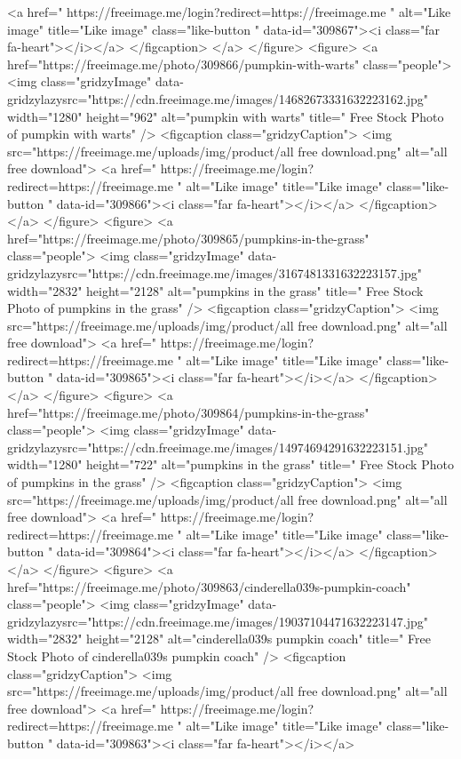 <a href=" https://freeimage.me/login?redirect=https://freeimage.me " alt="Like image" title="Like image" class="like-button  " data-id="309867"><i class="far fa-heart"></i></a>
</figcaption>
</a>
</figure>
<figure>
<a href="https://freeimage.me/photo/309866/pumpkin-with-warts" class="people">
<img class="gridzyImage" data-gridzylazysrc="https://cdn.freeimage.me/images/14682673331632223162.jpg" width="1280" height="962" alt="pumpkin with warts" title=" Free Stock Photo of pumpkin with warts" />
<figcaption class="gridzyCaption">
<img src="https://freeimage.me/uploads/img/product/all free download.png" alt="all free download">
<a href=" https://freeimage.me/login?redirect=https://freeimage.me " alt="Like image" title="Like image" class="like-button  " data-id="309866"><i class="far fa-heart"></i></a>
</figcaption>
 </a>
</figure>
<figure>
<a href="https://freeimage.me/photo/309865/pumpkins-in-the-grass" class="people">
<img class="gridzyImage" data-gridzylazysrc="https://cdn.freeimage.me/images/3167481331632223157.jpg" width="2832" height="2128" alt="pumpkins in the grass" title=" Free Stock Photo of pumpkins in the grass" />
<figcaption class="gridzyCaption">
<img src="https://freeimage.me/uploads/img/product/all free download.png" alt="all free download">
<a href=" https://freeimage.me/login?redirect=https://freeimage.me " alt="Like image" title="Like image" class="like-button  " data-id="309865"><i class="far fa-heart"></i></a>
</figcaption>
</a>
</figure>
<figure>
<a href="https://freeimage.me/photo/309864/pumpkins-in-the-grass" class="people">
<img class="gridzyImage" data-gridzylazysrc="https://cdn.freeimage.me/images/14974694291632223151.jpg" width="1280" height="722" alt="pumpkins in the grass" title=" Free Stock Photo of pumpkins in the grass" />
<figcaption class="gridzyCaption">
<img src="https://freeimage.me/uploads/img/product/all free download.png" alt="all free download">
<a href=" https://freeimage.me/login?redirect=https://freeimage.me " alt="Like image" title="Like image" class="like-button  " data-id="309864"><i class="far fa-heart"></i></a>
</figcaption>
</a>
</figure>
<figure>
<a href="https://freeimage.me/photo/309863/cinderella039s-pumpkin-coach" class="people">
<img class="gridzyImage" data-gridzylazysrc="https://cdn.freeimage.me/images/19037104471632223147.jpg" width="2832" height="2128" alt="cinderella039s pumpkin coach" title=" Free Stock Photo of cinderella039s pumpkin coach" />
<figcaption class="gridzyCaption">
<img src="https://freeimage.me/uploads/img/product/all free download.png" alt="all free download">
<a href=" https://freeimage.me/login?redirect=https://freeimage.me " alt="Like image" title="Like image" class="like-button  " data-id="309863"><i class="far fa-heart"></i></a>
